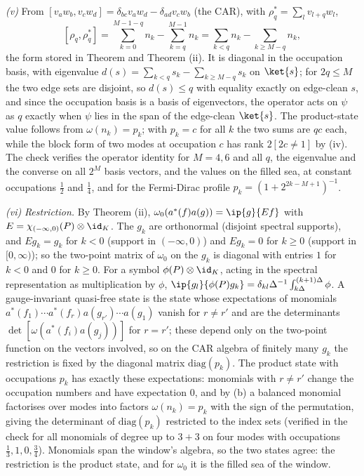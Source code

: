 \emph{(v)} From $[v_{a}w_{b}, v_{c}w_{d}] = \delta_{bc}v_{a}w_{d} - \delta_{ad}v_{c}w_{b}$ (the CAR), with $\rho_{q}^{*} = \sum_{l}v_{l+q}w_{l}$,
\[
[\rho_{q}, \rho_{q}^{*}] = \sum_{k=0}^{M-1-q}n_{k} - \sum_{k=q}^{M-1}n_{k} = \sum_{k<q}n_{k} - \sum_{k \ge M-q}n_{k},
\]
the form stored in Theorem  and Theorem (ii). It is diagonal in the occupation basis, with eigenvalue $d(s) = \sum_{k<q}s_{k} - \sum_{k \ge M-q}s_{k}$ on $\ket{s}$; for $2q \le M$ the two edge sets are disjoint, so $d(s) \le q$ with equality exactly on edge-clean $s$, and since the occupation basis is a basis of eigenvectors, the operator acts on $\psi$ as $q$ exactly when $\psi$ lies in the span of the edge-clean $\ket{s}$. The product-state value follows from $\omega(n_{k}) = p_{k}$; with $p_{k} = c$ for all $k$ the two sums are $qc$ each, while the block form of two modes at occupation $c$ has rank $2[2c \ne 1]$ by (iv). The check verifies the operator identity for $M = 4, 6$ and all $q$, the eigenvalue and the converse on all $2^{M}$ basis vectors, and the values on the filled sea, at constant occupations $\tfrac12$ and $\tfrac14$, and for the Fermi-Dirac profile $p_{k} = (1 + 2^{2k - M + 1})^{-1}$.

\emph{(vi)} \emph{Restriction.} By Theorem (ii), $\omega_{0}(a^{*}(f)a(g)) = \ip{g}{Ef}$ with $E = \chi_{(-\infty,0)}(P)\otimes\id_{K}$. The $g_{k}$ are orthonormal (disjoint spectral supports), and $Eg_{k} = g_{k}$ for $k < 0$ (support in $(-\infty, 0)$) and $Eg_{k} = 0$ for $k \ge 0$ (support in $[0, \infty)$); so the two-point matrix of $\omega_{0}$ on the $g_{k}$ is diagonal with entries $1$ for $k < 0$ and $0$ for $k \ge 0$. For a symbol $\phi(P)\otimes\id_{K}$, acting in the spectral representation as multiplication by $\phi$, $\ip{g_{l}}{\phi(P)g_{k}} = \delta_{kl}\Delta^{-1}\int_{k\Delta}^{(k+1)\Delta}\phi$. A gauge-invariant quasi-free state is the state whose expectations of monomials $a^{*}(f_{1})\cdots a^{*}(f_{r})a(g_{r'})\cdots a(g_{1})$ vanish for $r \ne r'$ and are the determinants $\det[\omega(a^{*}(f_{i})a(g_{j}))]$ for $r = r'$; these depend only on the two-point function on the vectors involved, so on the CAR algebra of finitely many $g_{k}$ the restriction is fixed by the diagonal matrix $\mathrm{diag}(p_{k})$. The product state with occupations $p_{k}$ has exactly these expectations: monomials with $r \ne r'$ change the occupation numbers and have expectation $0$, and by (b) a balanced monomial factorises over modes into factors $\omega(n_{k}) = p_{k}$ with the sign of the permutation, giving the determinant of $\mathrm{diag}(p_{k})$ restricted to the index sets (verified in the check for all monomials of degree up to $3 + 3$ on four modes with occupations $\tfrac13, 1, 0, \tfrac34$). Monomials span the window's algebra, so the two states agree: the restriction is the product state, and for $\omega_{0}$ it is the filled sea of the window.

